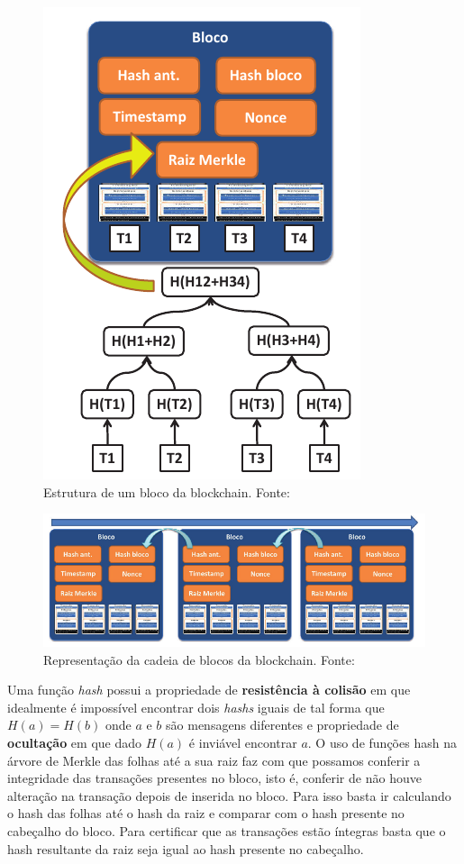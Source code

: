 \documentclass[12pt]{article}
\begin{document}
\begin{figure}[H]
    \centering
    \includegraphics[scale=0.4]{Imagens/estrutura_blockchain.png}
    \caption{Estrutura de um bloco da blockchain. Fonte: \cite{braga2017segurancca}}
    \label{fig:estrutura_blockchain}
\end{figure}

\begin{figure}[H]
    \centering
    \includegraphics[scale=0.6]{Imagens/cadeia_blockchain.png}
    \caption{Representação da cadeia de blocos da blockchain. Fonte: \cite{braga2017segurancca}}
    \label{fig:cadeia_blockchain}
\end{figure}

Uma função \emph{hash} possui a propriedade de \textbf{resistência à colisão} em que idealmente é impossível encontrar dois \emph{hashs} iguais de tal forma que $H(a) = H(b)$ onde $a$ e $b$ são mensagens diferentes e propriedade de \textbf{ocultação} em que dado $H(a)$ é inviável encontrar $a$. O uso de funções hash na árvore de Merkle das folhas até a sua raiz faz com que possamos conferir a integridade das transações presentes no bloco, isto é, conferir de não houve alteração na transação depois de inserida no bloco. Para isso basta ir calculando o hash das folhas até o hash da raiz e comparar com o hash presente no cabeçalho do bloco. Para certificar que as transações estão íntegras basta que o hash resultante da raiz seja igual ao hash presente no cabeçalho.
\end{document}
